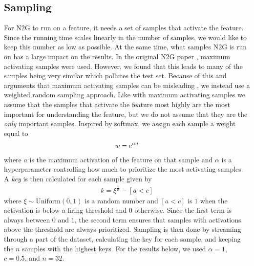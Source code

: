 \subsection{Sampling}
For N2G to run on a feature, it needs a set of samples that activate the feature.
Since the running time scales linearly in the number of samples, we would like to keep this number as low as possible.
At the same time, what samples N2G is run on has a large impact on the results.
In the original N2G paper , maximum activating samples were used.
However, we found that this leads to many of the samples being very similar which pollutes the test set.
Because of this and arguments that maximum activating samples can be misleading , we instead use a weighted random sampling approach.
Like with maximum activating samples we assume that the samples that activate the feature most highly are the most important for understanding the feature, but we do not assume that they are the \emph{only} important samples.
Inspired by softmax, we assign each sample a weight equal to
\begin{align*}
    w=\mathrm{e}^{\alpha a}
\end{align*}
where $a$ is the maximum activation of the feature on that sample and $\alpha$ is a hyperparameter controlling how much to prioritize the most activating samples.
A \emph{key} is then calculated for each sample given by
\begin{align*}
    k=\xi^{\frac1w}-[a<c]
\end{align*}
where $\xi\sim\mathrm{Uniform}(0,1)$ is a random number and $[a<c]$ is $1$ when the activation is below a firing threshold and $0$ otherwise.
Since the first term is always between $0$ and $1$, the second term ensures that samples with activations above the threshold are always prioritized.
Sampling is then done by streaming through a part of the dataset, calculating the key for each sample, and keeping the $n$ samples with the highest keys.
For the results below, we used $\alpha=1$, $c=0.5$, and $n=32$.


